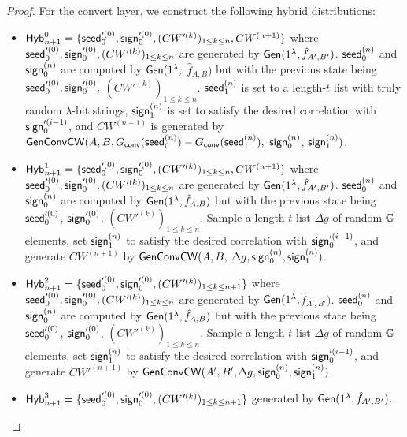 \begin{proof}
    For the convert layer, we construct the following hybrid distributions: 
    \begin{itemize}
        \item ${\sf Hyb}_{n+1}^0 = \{{\sf seed}_0'^{(0)},{\sf sign}_0'^{(0)},(CW'^{(k)})_{1\le k\le n},CW^{(n+1)}\}$ \linebreak 
        where ${\sf seed}_0'^{(0)},{\sf sign}_0'^{(0)},(CW'^{(k)})_{1\le k\le n}$ are generated by ${\sf Gen}(1^\lambda, \hat{f}_{A',B'})$. ${\sf seed}_0^{(n)}$ and ${\sf sign}_0^{(n)}$ are computed by ${\sf Gen}(1^\lambda, $\linebreak
        $\hat{f}_{A,B})$ but with the previous state being ${\sf seed}_0'^{(0)},{\sf sign}_0'^{(0)},$\linebreak
        $(CW'^{(k)})_{1\le k\le n}$. ${\sf seed}_1^{(n)}$ is set to a length-$t$ list with truly random $\lambda$-bit strings, ${\sf sign}_1^{(n)}$ is set to satisfy the desired correlation with ${\sf sign}_0'^{(i-1)}$, and $CW^{(n+1)}$ is generated by \linebreak
        ${\sf Gen}{\sf Conv}{\sf CW}(A,B,G_{{\sf conv}}({\sf seed}_0^{(n)}) - G_{\sf conv}({\sf seed}_1^{(n)}),$ ${\sf sign}_0^{(n)}$, \linebreak
        ${\sf sign}_1^{(n)})$. 
        \item ${\sf Hyb}_{n+1}^1 = \{{\sf seed}_0'^{(0)},{\sf sign}_0'^{(0)},(CW'^{(k)})_{1\le k\le n},CW^{(n+1)}\}$\linebreak 
        where ${\sf seed}_0'^{(0)},{\sf sign}_0'^{(0)},(CW'^{(k)})_{1\le k\le n}$ are generated by\linebreak 
        ${\sf Gen}(1^\lambda, \hat{f}_{A',B'})$. ${\sf seed}_0^{(n)}$ and ${\sf sign}_0^{(n)}$ are computed by\linebreak 
        ${\sf Gen}(1^\lambda, \hat{f}_{A,B})$ but with the previous state being ${\sf seed}_0'^{(0)}$, ${\sf sign}_0'^{(0)}$, $(CW'^{(k)})_{1\le k\le n}$. Sample a length-$t$ list $\Delta g$ of random $\mathbb{G}$ elements, set ${\sf sign}_1^{(n)}$ to satisfy the desired correlation with ${\sf sign}_0'^{(i-1)}$, and generate $CW^{(n+1)}$ by ${\sf Gen}{\sf Conv}{\sf CW}(A,B,$\linebreak
        $\Delta g, {\sf sign}_0^{(n)},{\sf sign}_1^{(n)})$. 
        \item${\sf Hyb}_{n+1}^2 = \{{\sf seed}_0'^{(0)},{\sf sign}_0'^{(0)},(CW'^{(k)})_{1\le k\le n+1}\}$ where \linebreak${\sf seed}_0'^{(0)},{\sf sign}_0'^{(0)},(CW'^{(k)})_{1\le k\le n}$ are generated by ${\sf Gen}(1^\lambda,$\linebreak$ \hat{f}_{A',B'})$. ${\sf seed}_0^{(n)}$ and ${\sf sign}_0^{(n)}$ are computed by ${\sf Gen}(1^\lambda, \hat{f}_{A,B})$ but with the previous state being ${\sf seed}_0'^{(0)}$, ${\sf sign}_0'^{(0)}$, \linebreak$(CW'^{(k)})_{1\le k\le n}$. Sample a length-$t$ list $\Delta g$ of random $\mathbb{G}$ elements, set ${\sf sign}_1^{(n)}$ to satisfy the desired correlation with ${\sf sign}_0'^{(i-1)}$, and generate $CW'^{(n+1)}$ by ${\sf Gen}{\sf Conv}{\sf CW}(A',B',$\linebreak$\Delta g, {\sf sign}_0^{(n)},{\sf sign}_1^{(n)})$. 
        \item${\sf Hyb}_{n+1}^3 = \{{\sf seed}_0'^{(0)},{\sf sign}_0'^{(0)},(CW'^{(k)})_{1\le k\le n+1}\}$ generated by ${\sf Gen}(1^\lambda, \hat{f}_{A',B'})$. 
    \end{itemize}


\end{proof}
